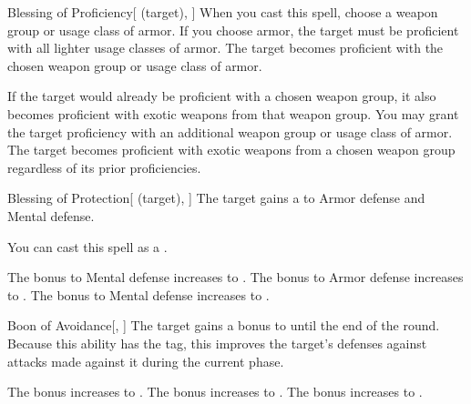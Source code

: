 \lowercase{\hypertarget{spell:Blessing of Proficiency}{}}\label{spell:Blessing of Proficiency}
\begin{attuneability}[Rank 1]{\hypertarget{spell:Blessing of Proficiency}{Blessing of Proficiency}}[ (target), ]
When you cast this spell, choose a weapon group or usage class of armor.
If you choose armor, the target must be proficient with all lighter usage classes of armor.
The target becomes proficient with the chosen weapon group or usage class of armor.

\rankline
{} If the target would already be proficient with a chosen weapon group, it also becomes proficient with exotic weapons from that weapon group.
 You may grant the target proficiency with an additional weapon group or usage class of armor.
 The target becomes proficient with exotic weapons from a chosen weapon group regardless of its prior proficiencies.
\end{attuneability}
\vspace{0.25em}



\lowercase{\hypertarget{spell:Blessing of Protection}{}}\label{spell:Blessing of Protection}
\begin{attuneability}[Rank 1]{\hypertarget{spell:Blessing of Protection}{Blessing of Protection}}[ (target), ]
The target gains a   to Armor defense and Mental defense.

You can cast this spell as a .

\rankline
{} The bonus to Mental defense increases to .
 The bonus to Armor defense increases to .
 The bonus to Mental defense increases to .
\end{attuneability}
\vspace{0.25em}



\lowercase{\hypertarget{spell:Boon of Avoidance}{}}\label{spell:Boon of Avoidance}
\begin{freeability}[Rank 1]{\hypertarget{spell:Boon of Avoidance}{Boon of Avoidance}}[, ]
The target gains a  bonus to  until the end of the round.
Because this ability has the  tag, this improves the target's defenses against attacks made against it during the current phase.

\rankline
{} The bonus increases to .
 The bonus increases to .
 The bonus increases to .
\end{freeability}
\vspace{0.25em}



